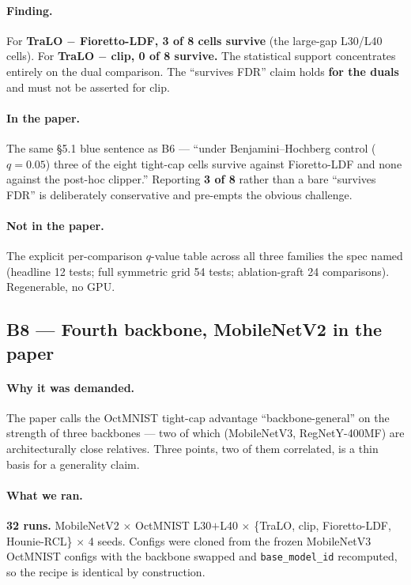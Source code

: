 \documentclass[11pt,a4paper]{article}
\newcommand{\yes}{\textcolor{okgreen}{\textbf{in the paper}}}
\begin{document}
\paragraph{Finding.} For \textbf{TraLO $-$ Fioretto-LDF, 3 of 8 cells survive} (the large-gap
L30/L40 cells). For \textbf{TraLO $-$ clip, 0 of 8 survive.} The statistical support concentrates
entirely on the dual comparison. The ``survives FDR'' claim holds \textbf{for the duals} and must
not be asserted for clip.

\paragraph{In the paper.} The same \S5.1 blue sentence as B6 --- ``under Benjamini--Hochberg control
($q{=}0.05$) three of the eight tight-cap cells survive against Fioretto-LDF and none against the
post-hoc clipper.'' Reporting \textbf{3 of 8} rather than a bare ``survives FDR'' is deliberately
conservative and pre-empts the obvious challenge.

\paragraph{Not in the paper.} The explicit per-comparison $q$-value table across all three families
the spec named (headline 12 tests; full symmetric grid 54 tests; ablation-graft 24 comparisons).
Regenerable, no GPU.

\subsection*{B8 --- Fourth backbone, MobileNetV2 \hfill\normalsize\yes}

\paragraph{Why it was demanded.} The paper calls the OctMNIST tight-cap advantage
``backbone-general'' on the strength of three backbones --- two of which (MobileNetV3,
RegNetY-400MF) are architecturally close relatives. Three points, two of them correlated, is a thin
basis for a generality claim.

\paragraph{What we ran.} \textbf{32 runs.} MobileNetV2 $\times$ OctMNIST L30$+$L40 $\times$ \{TraLO,
clip, Fioretto-LDF, Hounie-RCL\} $\times$ 4 seeds. Configs were cloned from the frozen MobileNetV3
OctMNIST configs with the backbone swapped and \texttt{base\_model\_id} recomputed, so the recipe is
identical by construction.
\end{document}
